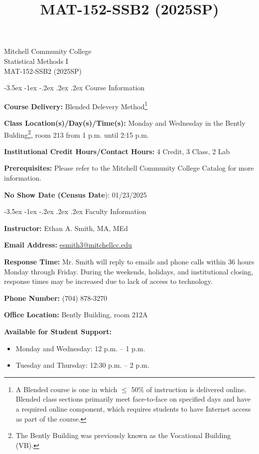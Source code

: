 \documentclass[11pt]{article}
\title{MAT-152-SSB2 (2025SP)}
\makeatletter
\renewcommand\section{\@startsection{section}{1}{0pt}%
  {-3.5ex \@plus -1ex \@minus -.2ex}%
  {.2ex \@plus.2ex}%
  {\normalfont\Large\bfseries}} %
\makeatother
\begin{document}
\begin{center}
    {\huge Mitchell Community College} \\[6pt]
    {\Large Statistical Methods I} \\[6pt]
    {\Large MAT-152-SSB2 (2025SP)}
\end{center}

\section{Course Information}

\textbf{Course Delivery:} Blended Delevery Method\footnote{A Blended course is one in which $\leq$ 50\% of instruction is delivered online. Blended class sections primarily meet face-to-face on specified days and have a required online component, which requires students to have Internet access as part of the course.}

\textbf{Class Location(s)/Day(s)/Time(s):} Monday and Wednesday in the Bently Bulding\footnote{The Bently Building was previously known as the Vocational Building (VB).}, room 213 from 1 p.m. until 2:15 p.m.

\textbf{Institutional Credit Hours/Contact Hours:} 4 Credit, 3 Class, 2 Lab

\textbf{Prerequisites:} Please refer to the Mitchell Community College Catalog for more information.

\textbf{No Show Date (Census Date}): 01/23/2025

\section{Faculty Information}

\textbf{Instructor:} Ethan A. Smith, MA, MEd

\textbf{Email Address:} \href{mailto:esmith3@mitchellcc.edu}{esmith3@mitchellcc.edu}

\textbf{Response Time:} Mr. Smith will reply to emails and phone calls within 36 hours Monday through Friday. During the weekends, holidays, and institutional closing, response times may be increased due to lack of access to technology.

\textbf{Phone Number:} (704) 878-3270

\textbf{Office Location:} Bently Building, room 212A

\textbf{Available for Student Support:}

\begin{itemize}
\item Monday and Wednesday: 12 p.m. -- 1 p.m.
\item Tuesday and Thursday: 12:30 p.m. -- 2 p.m.
\end{itemize}
\end{document}
